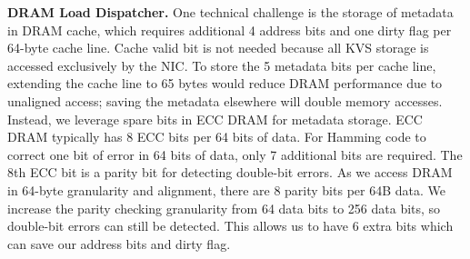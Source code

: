 \textbf{DRAM Load Dispatcher.}
One technical challenge is the storage of metadata in DRAM cache, which requires additional 4 address bits and one dirty flag per 64-byte cache line.
Cache valid bit is not needed because all KVS storage is accessed exclusively by the NIC.
To store the 5 metadata bits per cache line, extending the cache line to 65 bytes would reduce DRAM performance due to unaligned access; saving the metadata elsewhere will double memory accesses.
Instead, we leverage spare bits in ECC DRAM for metadata storage.
ECC DRAM typically has 8 ECC bits per 64 bits of data.
For Hamming code to correct one bit of error in 64 bits of data, only 7 additional bits are required.
The 8th ECC bit is a parity bit for detecting double-bit errors.
As we access DRAM in 64-byte granularity and alignment, there are 8 parity bits per 64B data.
We increase the parity checking granularity from 64 data bits to 256 data bits, so double-bit errors can still be detected. This allows us to have 6 extra bits which can save our address bits and dirty flag.


